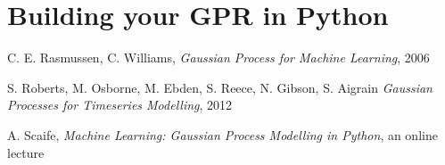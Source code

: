 \documentclass[10pt,twocolumn]{article}
\begin{document}
\section{Building your GPR in Python}











\thebibliography{}

 C. E. Rasmussen, C. Williams, \textit{Gaussian Process for Machine Learning}, 2006

 S. Roberts, M. Osborne, M. Ebden, S. Reece, N. Gibson, S. Aigrain \textit{Gaussian Processes for Timeseries Modelling}, 2012

 A. Scaife, \textit{Machine Learning: Gaussian Process Modelling in Python}, an online lecture



 \label{bib:pope}
\end{document}
